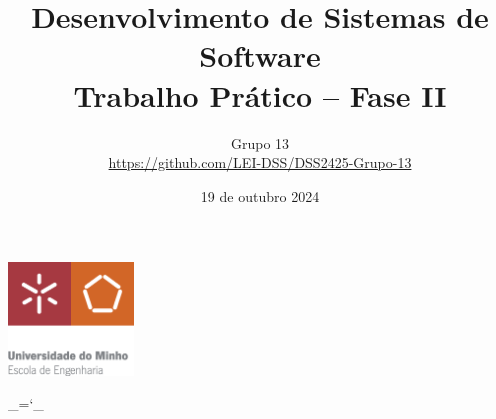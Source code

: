 \documentclass[12pt, a4paper]{article}
\title{\textbf{Desenvolvimento de Sistemas de Software \\ \large Trabalho Prático -- Fase II}}
\date{19 de outubro 2024}
\author{
    Grupo 13 \\
    \url{https://github.com/LEI-DSS/DSS2425-Grupo-13}
}
\begin{document}
\begin{center}
    \includegraphics[width=0.25\textwidth]{Imagens/Capa/EE-C.eps}
\end{center}

{\let\newpage\relax\maketitle}
\maketitle
\thispagestyle{empty}

\chardef\_=`_
\onehalfspacing
\setlength{\parskip}{\baselineskip}
\setlength{\parindent}{0pt}
\def\arraystretch{1.5}
\end{document}
